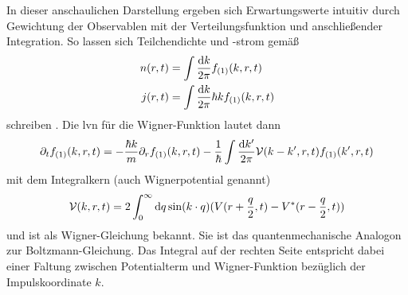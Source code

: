 In dieser anschaulichen Darstellung ergeben sich Erwartungswerte intuitiv durch Gewichtung der Observablen mit der Verteilungsfunktion und anschließender Integration. So lassen sich Teilchendichte und -strom gemäß
\begin{align}
  n(r,t) &= \int \frac{\mathop{}\!\mathrm{d} k}{2\pi}f_{(1)}(k,r,t) \label{eq:wigner_n}\\
  j(r,t) &= \int \frac{\mathop{}\!\mathrm{d} k}{2\pi}\hbar k f_{(1)}(k,r,t)
\end{align}
schreiben \cite{modern}. Die \ac{lvn} für die Wigner-Funktion lautet dann \cite{frensley2, failure}
\begin{equation}
  \partial_t f_{(1)}(k,r,t) = -\frac{\hbar k}{m}\partial_r f_{(1)}(k,r,t) - \frac{1}{\hbar} \int \frac{\mathop{}\!\mathrm{d} k'}{2\pi}\mathcal{V}(k-k',r,t)f_{(1)}(k',r,t)
  \label{eq:wigner}
\end{equation}
mit dem Integralkern (auch Wignerpotential genannt)
\begin{equation*}
  \mathcal{V}(k,r,t) = 2\int_0^{\infty} \mathop{}\!\mathrm{d} q \sin(k\cdot q) (V(r+\frac{q}{2},t) - V^*(r-\frac{q}{2},t))
\end{equation*}
und ist als Wigner-Gleichung bekannt. Sie ist das quantenmechanische Analogon zur Boltzmann-Gleichung. Das Integral auf der rechten Seite entspricht dabei einer Faltung zwischen Potentialterm und Wigner-Funktion bezüglich der Impulskoordinate $k$.



